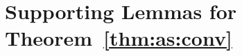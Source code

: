 \documentclass[11pt,a4paper]{article}
\theoremstyle{definition}
\begin{document}









\section{Supporting Lemmas for Theorem~\ref{thm:as:conv}}
\label{appendix:proof:as:conv}
\end{document}
